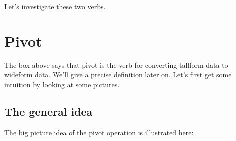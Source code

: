 \documentclass[letterpaper,10pt,english]{jupyterBook}
\begin{document}
\sphinxAtStartPar
Let’s investigate these two verbs.


\section{Pivot}
\label{\detokenize{chapter-6-single-table-verbs:pivot}}
\sphinxAtStartPar
The box above says that pivot is the verb for converting tall\sphinxhyphen{}form data to wide\sphinxhyphen{}form data.  We’ll give a precise definition later on.  Let’s first get some intuition by looking at some pictures.


\subsection{The general idea}
\label{\detokenize{chapter-6-single-table-verbs:the-general-idea}}
\sphinxAtStartPar
The big picture idea of the pivot operation is illustrated here:

\sphinxAtStartPar
{}
\end{document}
